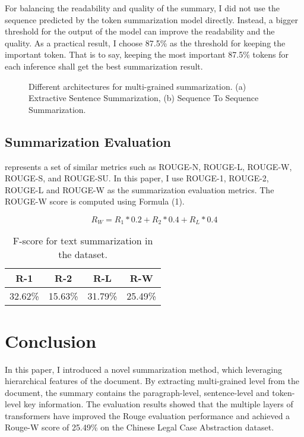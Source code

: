 \documentclass[11pt,a4paper]{article}
\begin{document}
For balancing the readability and quality of the summary, I did not use the sequence predicted by the token summarization model directly.
Instead, a bigger threshold for the output of the model can improve the readability and the quality.
As a practical result, I choose 87.5\% as the threshold for keeping the important token.
That is to say, keeping the most important 87.5\% tokens for each inference shall get the best summarization result.

\begin{figure*}
\begin{center}
\end{center}
   \caption{Different architectures for multi-grained summarization.
   (a) Extractive Sentence Summarization,
   (b) Sequence To Sequence Summarization.}
\label{fig:short}
\end{figure*}

\subsection{Summarization Evaluation}

\citet{lin2004rouge} represents a set of similar metrics such as ROUGE-N, ROUGE-L, ROUGE-W, ROUGE-S, and ROUGE-SU.
In this paper, I use ROUGE-1, ROUGE-2, ROUGE-L and ROUGE-W as the summarization evaluation metrics.
The ROUGE-W score is computed using Formula (1).

\begin{equation}
  {R_W} = {R_1} * 0.2 + {R_2} * 0.4 + {R_L} * 0.4
\end{equation}

\begin{table}
\centering
\begin{tabular}{cccc}
\hline
\textbf{R-1} & \textbf{R-2} & \textbf{R-L} & \textbf{R-W} \\
\hline
32.62\% & 15.63\% & 31.79\% & 25.49\% \\
\hline
\end{tabular}
\caption{F-score for text summarization in the dataset.}
\end{table}

\section{Conclusion}

In this paper, I introduced a novel summarization method, which leveraging hierarchical features of the document.
By extracting multi-grained level from the document, the summary contains the paragraph-level, sentence-level and token-level key information.
The evaluation results showed that the multiple layers of transformers have improved the Rouge evaluation performance
and achieved a Rouge-W score of 25.49\% on the Chinese Legal Case Abstraction dataset.





\end{document}
